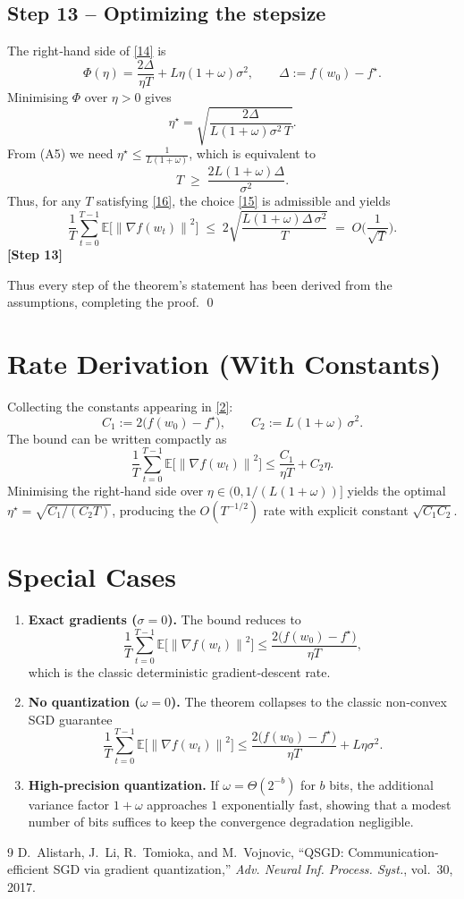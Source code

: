 \documentclass{article}
\newcommand{\E}{\mathbb{E}}
\newcommand{\norm}[1]{\left\lVert #1\right\rVert}
\newcommand{\grad}{\nabla}
\begin{document}
\subsection*{Step 13 – Optimizing the stepsize}
The right‑hand side of \eqref{14} is
\[
\Phi(\eta)=\frac{2\Delta}{\eta T}+L\eta(1+\omega)\sigma^2,
\qquad\Delta:=f(w_0)-f^{\star}.
\]
Minimising $\Phi$ over $\eta>0$ gives
\[
\eta^{\star}= \sqrt{\frac{2\Delta}{L(1+\omega)\sigma^2\,T}} .
\tag{15}
\]
From (A5) we need $\eta^{\star}\le\frac{1}{L(1+\omega)}$, which is equivalent to
\[
T\;\ge\;\frac{2L(1+\omega)\Delta}{\sigma^2}.
\tag{16}
\]
Thus, for any $T$ satisfying \eqref{16}, the choice \eqref{15} is admissible and yields
\[
\frac{1}{T}\sum_{t=0}^{T-1}\E\!\big[\norm{\grad f(w_t)}^2\big]
\;\le\;2\sqrt{\frac{L(1+\omega)\Delta\,\sigma^2}{T}}
\;=\;O\!\Big(\frac{1}{\sqrt{T}}\Big).
\]
\textbf{[Step 13]}

Thus every step of the theorem’s statement has been derived from the assumptions, completing the proof. \qed

\section*{Rate Derivation (With Constants)}
Collecting the constants appearing in \eqref{2}:
\[
C_1:=2\big(f(w_0)-f^{\star}\big),\qquad
C_2:=L(1+\omega)\,\sigma^2 .
\]
The bound can be written compactly as
\[
\frac{1}{T}\sum_{t=0}^{T-1}\E\!\big[\norm{\grad f(w_t)}^2\big]
\le \frac{C_1}{\eta T}+C_2\eta .
\]
Minimising the right‑hand side over $\eta\in(0,1/(L(1+\omega))]$ yields the optimal $\eta^{\star}= \sqrt{C_1/(C_2 T)}$, producing the $O(T^{-1/2})$ rate with explicit constant $\sqrt{C_1 C_2}$.

\section*{Special Cases}
\begin{enumerate}
\item \textbf{Exact gradients ($\sigma=0$).} The bound reduces to
\[
\frac{1}{T}\sum_{t=0}^{T-1}\E\!\big[\norm{\grad f(w_t)}^2\big]
\le \frac{2\big(f(w_0)-f^{\star}\big)}{\eta T},
\]
which is the classic deterministic gradient‑descent rate.
\item \textbf{No quantization ($\omega=0$).} The theorem collapses to the classic non‑convex SGD guarantee
\[
\frac{1}{T}\sum_{t=0}^{T-1}\E\!\big[\norm{\grad f(w_t)}^2\big]
\le \frac{2\big(f(w_0)-f^{\star}\big)}{\eta T}+L\eta\sigma^2 .
\]
\item \textbf{High‑precision quantization.} If $\omega = \Theta(2^{-b})$ for $b$ bits, the additional variance factor $1+\omega$ approaches $1$ exponentially fast, showing that a modest number of bits suffices to keep the convergence degradation negligible.
\end{enumerate}

\begin{thebibliography}{9}
D.~Alistarh, J.~Li, R.~Tomioka, and M.~Vojnovic, ``QSGD: Communication-efficient SGD via gradient quantization,'' \emph{Adv. Neural Inf. Process. Syst.}, vol.~30, 2017.
\end{thebibliography}
\end{document}
